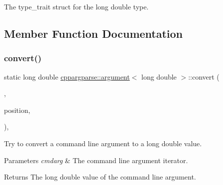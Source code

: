 The type\+\_\+trait struct for the long double type. 

\subsection{Member Function Documentation}
\mbox{\label{structcppargparse_1_1argument_3_01long_01double_01_4_a9987289594effd9b0561188827010cb2}} 
\subsubsection{\texorpdfstring{convert()}{convert()}}
{\footnotesize\ttfamily static long double \hyperlink{structcppargparse_1_1argument}{cppargparse\+::argument}$<$ long double $>$\+::convert (\begin{DoxyParamCaption}\item[{const types\+::\+Command\+Line\+\_\+t \&}]{,  }\item[{const types\+::\+Command\+Line\+Position\+\_\+t \&}]{position,  }\item[{const types\+::\+Command\+Line\+Arguments\+\_\+t \&}]{ }\end{DoxyParamCaption})\hspace{0.3cm}{\ttfamily [inline]}, {\ttfamily [static]}}



Try to convert a command line argument to a long double value. 


\begin{DoxyParams}{Parameters}
{\em cmdarg} & The command line argument iterator.\\
\hline
\end{DoxyParams}
\begin{DoxyReturn}{Returns}
The long double value of the command line argument. 
\end{DoxyReturn}
\mbox{\label{structcppargparse_1_1argument_3_01long_01double_01_4_a3030b59e675dcf51191cfc6e61bd6141}} 
